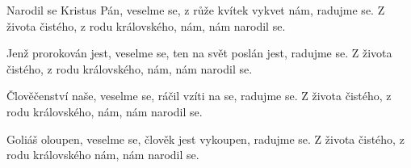 \vskip-5mm
\IncludeLilypond

Narodil se Kristus Pán, veselme se,
z růže kvítek vykvet nám, radujme se.
Z života čistého, z rodu královského,
nám, nám narodil se.

Jenž prorokován jest, veselme se,
ten na svět poslán jest, radujme se.
Z života čistého, z rodu královského,
nám, nám narodil se.

Člověčenství naše, veselme se,
ráčil vzíti na se, radujme se.
Z života čistého, z rodu královského,
nám, nám narodil se.

Goliáš oloupen, veselme se,
člověk jest vykoupen, radujme se.
Z života čistého, z rodu královského
nám, nám narodil se.
